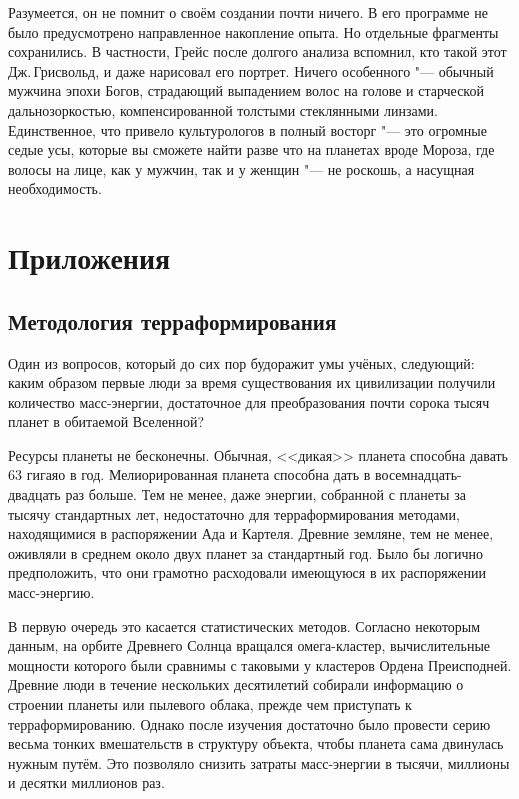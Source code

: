 Разумеется, он не помнит о своём создании почти ничего.
В его программе не было предусмотрено направленное накопление опыта.
Но отдельные фрагменты сохранились.
В частности, Грейс после долгого анализа вспомнил, кто такой этот Дж.\,Грисвольд, и даже нарисовал его портрет.
Ничего особенного "--- обычный мужчина эпохи Богов, страдающий выпадением волос на голове и старческой дальнозоркостью, компенсированной толстыми стеклянными линзами.
Единственное, что привело культурологов в полный восторг "--- это огромные седые усы, которые вы сможете найти разве что на планетах вроде Мороза, где волосы на лице, как у мужчин, так и у женщин "--- не роскошь, а насущная необходимость.

\chapter{Приложения}

\section{Методология терраформирования}

Один из вопросов, который до сих пор будоражит умы учёных, следующий: каким образом первые люди за время существования их цивилизации получили количество масс-энергии, достаточное для преобразования почти сорока тысяч планет в обитаемой Вселенной?

Ресурсы планеты не бесконечны.
Обычная, <<дикая>> планета способна давать 63 гигаяо в год.
Мелиорированная планета способна дать в восемнадцать-двадцать раз больше.
Тем не менее, даже энергии, собранной с планеты за тысячу стандартных лет, недостаточно для терраформирования методами, находящимися в распоряжении Ада и Картеля.
Древние земляне, тем не менее, оживляли в среднем около двух планет за стандартный год.
Было бы логично предположить, что они грамотно расходовали имеющуюся в их распоряжении масс-энергию.

В первую очередь это касается статистических методов.
Согласно некоторым данным, на орбите Древнего Солнца вращался омега-кластер, вычислительные мощности которого были сравнимы с таковыми у кластеров Ордена Преисподней.
Древние люди в течение нескольких десятилетий собирали информацию о строении планеты или пылевого облака, прежде чем приступать к терраформированию.
Однако после изучения достаточно было провести серию весьма тонких вмешательств в структуру объекта, чтобы планета сама двинулась нужным путём.
Это позволяло снизить затраты масс-энергии в тысячи, миллионы и десятки миллионов раз.

